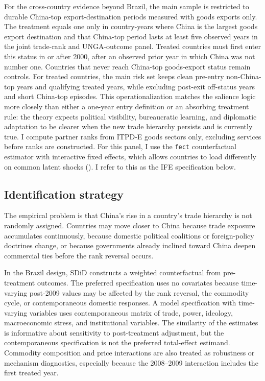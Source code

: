 \documentclass[
  12pt,
]{article}
\begin{document}
For the cross-country evidence beyond Brazil, the main sample is restricted to durable China-top export-destination periods measured with goods exports only. The treatment equals one only in country-years where China is the largest goods export destination and that China-top period lasts at least five observed years in the joint trade-rank and UNGA-outcome panel. Treated countries must first enter this status in or after 2000, after an observed prior year in which China was not number one. Countries that never reach China-top goods-export status remain controls. For treated countries, the main risk set keeps clean pre-entry non-China-top years and qualifying treated years, while excluding post-exit off-status years and short China-top episodes. This operationalization matches the salience logic more closely than either a one-year entry definition or an absorbing treatment rule: the theory expects political visibility, bureaucratic learning, and diplomatic adaptation to be clearer when the new trade hierarchy persists and is currently true. I compute partner ranks from ITPD-E goods sectors only, excluding services before ranks are constructed. For this panel, I use the \texttt{fect} counterfactual estimator with interactive fixed effects, which allows countries to load differently on common latent shocks (). I refer to this as the IFE specification below.

\subsection{Identification strategy}\label{identification-strategy}

The empirical problem is that China's rise in a country's trade hierarchy is not randomly assigned. Countries may move closer to China because trade exposure accumulates continuously, because domestic political coalitions or foreign-policy doctrines change, or because governments already inclined toward China deepen commercial ties before the rank reversal occurs.

In the Brazil design, SDiD constructs a weighted counterfactual from pre-treatment outcomes. The preferred specification uses no covariates because time-varying post-2009 values may be affected by the rank reversal, the commodity cycle, or contemporaneous domestic responses. A model specification with time-varying variables uses contemporaneous matrix of trade, power, ideology, macroeconomic stress, and institutional variables. The similarity of the estimates is informative about sensitivity to post-treatment adjustment, but the contemporaneous specification is not the preferred total-effect estimand. Commodity composition and price interactions are also treated as robustness or mechanism diagnostics, especially because the 2008--2009 interaction includes the first treated year.
\end{document}

